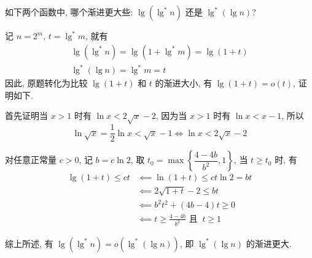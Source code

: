 \documentclass[boxes]{homework}
\begin{document}
\begin{problem}
如下两个函数中, 哪个渐进更大些: $\lg \left( \lg^{*} n\right)$ 还是 $\lg^{*}
    \left( \lg n\right)$?
\end{problem}
\begin{solution}
    记 $n = 2^{m}$, $t = \lg^{*} m$, 就有
    \begin{gather}
        \lg \left( \lg^{*} n\right) = \lg \left( 1 + \lg^{*} m\right) = \lg
        \left( 1 + t\right) \\
        \lg^{*} \left( \lg n\right) = \lg^{*} m = t
    \end{gather}
    因此, 原题转化为比较 $\lg \left( 1 + t\right)$ 和 $t$ 的渐进大小, 有 $\lg
        \left( 1 + t\right) = o \left( t\right)$, 证明如下.

    首先证明当 $x > 1$ 时有 $\ln x < 2 \sqrt{x} - 2$, 因为当 $x > 1$ 时有 $\ln
        x < x - 1$, 所以
    \begin{equation}
        \ln \sqrt{x} = \frac{ 1 }{ 2 } \ln x < \sqrt{x} - 1 \iff \ln x <
        2\sqrt{x} - 2
    \end{equation}

    对任意正常量 $c > 0$, 记 $b = c\ln 2$, 取 $t_{0} = \max \left\{
        \dfrac{ 4 - 4b }{ b^{2} }, 1\right\}$, 当 $t \geqslant t_{0}$ 时, 有
    \begin{equation}
        \begin{aligned}
            \lg \left( 1 + t\right) \leqslant ct
             & \impliedby \ln \left( 1 + t \right) \leqslant ct\ln 2 = bt     \\
             & \impliedby 2\sqrt{1 + t} - 2 \leqslant bt                      \\
             & \impliedby b^{2}t^{2} + \left( 4b - 4\right)t \geqslant 0      \\
             & \impliedby t \geqslant \frac{ 4 - 4b }{ b^{2} } \text{ 且 }\ t
            \geqslant 1
        \end{aligned}
    \end{equation}

    综上所述, 有 $\lg \left( \lg^{*} n\right) = o\left( \lg^{*} \left( \lg n
            \right)\right)$, 即 $\lg^{*} \left( \lg n\right)$ 的渐进更大.
\end{solution}
\end{document}
